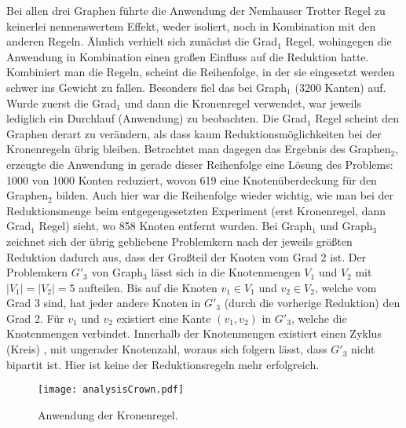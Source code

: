 Bei allen drei Graphen führte die Anwendung der Nemhauser Trotter Regel zu keinerlei nennenswertem Effekt, weder isoliert, noch in Kombination mit den anderen Regeln. Ähnlich verhielt sich zunächst die Grad$_{1}$ Regel, wohingegen die Anwendung in Kombination einen großen Einfluss auf die Reduktion hatte. Kombiniert man die Regeln, scheint die Reihenfolge, in der sie eingesetzt werden schwer ins Gewicht zu fallen. Besonders fiel das bei Graph$_{1}$ (3200 Kanten) auf. Wurde zuerst die Grad$_{1}$ und dann die Kronenregel verwendet, war jeweils lediglich ein Durchlauf (Anwendung) zu beobachten. Die Grad$_{1}$ Regel scheint den Graphen derart zu verändern, als dass kaum Reduktionsmöglichkeiten bei der Kronenregeln übrig bleiben. Betrachtet man dagegen das Ergebnis des Graphen$_{2}$, erzeugte die Anwendung in gerade dieser Reihenfolge eine Lösung des Problems: 1000 von 1000 Konten reduziert, wovon 619 eine Knotenüberdeckung für den Graphen$_{2}$ bilden. Auch hier war die Reihenfolge wieder wichtig, wie man bei der Reduktionsmenge beim entgegengesetzten Experiment (erst Kronenregel, dann Grad$_{1}$ Regel) sieht, wo 858 Knoten entfernt wurden. Bei Graph$_{1}$ und Graph$_{3}$ zeichnet sich der übrig gebliebene Problemkern nach der jeweils größten Reduktion dadurch aus, dass der Großteil der Knoten vom Grad 2 ist. Der Problemkern $G'_{3}$ von Graph$_{3}$ lässt sich in die Knotenmengen $V_{1}$ und $V_{2}$  mit $|V_{1}| = |V_{2}| = 5$ aufteilen. Bis auf die Knoten $v_{1} \in V_{1}$ und $v_{2} \in V_{2}$, welche vom Grad 3 sind, hat jeder andere Knoten in  $G'_{3}$ (durch die vorherige Reduktion) den Grad 2. Für  $v_{1}$ und $v_{2}$ existiert eine Kante $(v_{1}, v_{2})$ in $G'_{3}$, welche die Knotenmengen verbindet. Innerhalb der Knotenmengen existiert einen Zyklus (Kreis) \cite{dummy}, mit ungerader Knotenzahl, woraus sich folgern lässt, dass $G'_{3}$ nicht bipartit ist. Hier ist keine der Reduktionsregeln mehr erfolgreich.

\begin{figure}[htb]
\centering
  	{\texttt{[image: analysisCrown.pdf]}}
	\caption{Anwendung der Kronenregel.\label{fig:crown}}
\centering
\end{figure}

